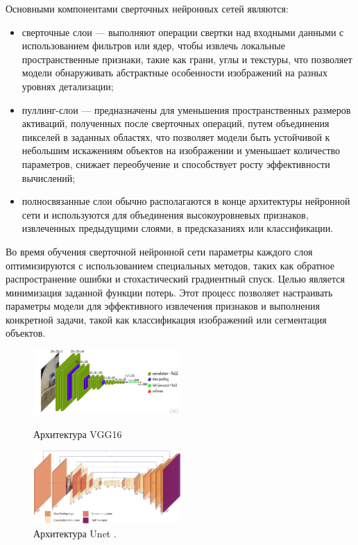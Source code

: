 Основными компонентами сверточных нейронных сетей являются:
 \begin{itemize}
    \item сверточные слои --- выполняют операции свертки над входными данными с использованием фильтров или ядер, 
    чтобы извлечь локальные пространственные признаки, такие как грани, углы и текстуры, что позволяет модели обнаруживать 
    абстрактные особенности изображений на разных уровнях детализации;
    \item пуллинг-слои --- предназначены для уменьшения пространственных размеров активаций, полученных после сверточных операций, путем 
    объединения пикселей в заданных областях, что позволяет модели быть устойчивой к небольшим искажениям объектов 
    на изображении и уменьшает количество параметров,  снижает переобучение и способствует росту эффективности вычислений;
    \item полносвязанные слои обычно располагаются в конце архитектуры нейронной сети и используются для объединения высокоуровневых признаков, 
    извлеченных предыдущими слоями, в предсказаниях или классификации.
\end{itemize}
 
Во время обучения сверточной нейронной сети параметры каждого слоя оптимизируются с использованием специальных методов, таких как обратное 
распространение ошибки и стохастический градиентный спуск. Целью является минимизация заданной функции потерь. Этот процесс позволяет настраивать 
параметры модели для эффективного извлечения признаков и выполнения конкретной задачи, такой как классификация изображений или сегментация объектов.

\begin{figure}[h]
    \centering
    \includegraphics[width=0.5\textwidth]{assets/ml/cv/vgg16.jpg}
    \caption{Архитектура VGG16 \cite{simonyan2014very}}
    \includegraphics[width=0.5\textwidth]{assets/ml/cv/unet.png}
    \caption{Архитектура Unet \cite{ronneberger2015u}.}
    \label{vgg_arch}
\end{figure}

